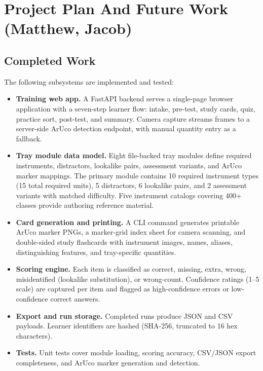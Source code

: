 \documentclass[10pt,a4paper]{article}
\begin{document}

\section{Project Plan And Future Work \hfill {\normalfont\small (Matthew, Jacob)}}
\label{sec:project-plan-and-future-work}
\subsection{Completed Work}

The following subsystems are implemented and tested:
\begin{itemize}
  \item \textbf{Training web app.} A FastAPI backend serves a single-page browser application with a seven-step learner flow: intake, pre-test, study cards, quiz, practice sort, post-test, and summary. Camera capture streams frames to a server-side ArUco detection endpoint, with manual quantity entry as a fallback.
  \item \textbf{Tray module data model.} Eight file-backed tray modules define required instruments, distractors, lookalike pairs, assessment variants, and ArUco marker mappings. The primary module contains 10 required instrument types (15 total required units), 5 distractors, 6 lookalike pairs, and 2 assessment variants with matched difficulty. Five instrument catalogs covering 400+ classes provide authoring reference material.
  \item \textbf{Card generation and printing.} A CLI command generates printable ArUco marker PNGs, a marker-grid index sheet for camera scanning, and double-sided study flashcards with instrument images, names, aliases, distinguishing features, and tray-specific quantities.
  \item \textbf{Scoring engine.} Each item is classified as correct, missing, extra, wrong, misidentified (lookalike substitution), or wrong-count. Confidence ratings (1--5 scale) are captured per item and flagged as high-confidence errors or low-confidence correct answers.
  \item \textbf{Export and run storage.} Completed runs produce JSON and CSV payloads. Learner identifiers are hashed (SHA-256, truncated to 16 hex characters).
  \item \textbf{Tests.} Unit tests cover module loading, scoring accuracy, CSV/JSON export completeness, and ArUco marker generation and detection.
\end{itemize}
\end{document}
